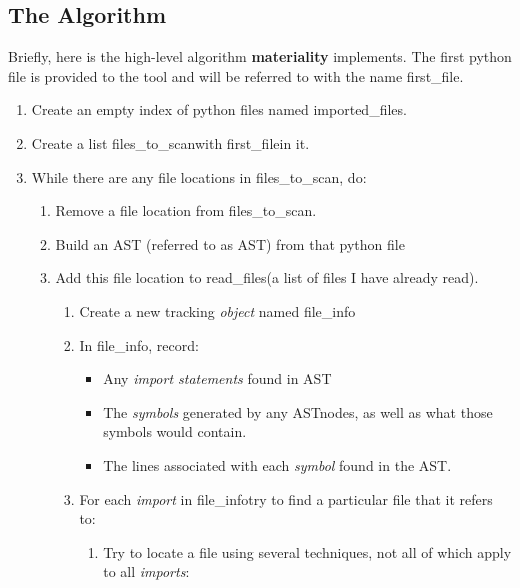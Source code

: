 \documentclass[a4paper,man,natbib,floatsintext]{apa6}
\begin{document}
  \subsection{The Algorithm}
  \singlespace %
  Briefly, here is the high-level algorithm \textbf{materiality} implements. The first \Gls{python} file is provided to the tool and will be referred to with the name \textlangle first\_file\textrangle.
  \begin{enumerate}
    \item Create an empty index of python files named \textlangle imported\_files\textrangle.
    \item Create a list \textlangle files\_to\_scan\textrangle with \textlangle first\_file\textrangle in it. 
    \item While there are any file locations in \textlangle files\_to\_scan\textrangle, do:
    \begin{enumerate}
      \item Remove a file location from \textlangle files\_to\_scan\textrangle.
      \item Build an AST (referred to as \textlangle AST\textrangle) from that \Gls{python} file
      \item Add this file location to \textlangle read\_files\textrangle (a list of files I have already read).
      \begin{enumerate}
        \item Create a new tracking \textit{object} named \textlangle file\_info\textrangle
        \item In \textlangle file\_info\textrangle, record:
        \begin{itemize}
          \item Any \textit{import statements} found in \textlangle AST\textrangle
          \item The \textit{symbols} generated by any \textlangle AST\textrangle nodes, as well as what those symbols would contain.
          \item The lines associated with each \textit{symbol} found in the \textlangle AST\textrangle.
        \end{itemize}
        \item For each \textit{import} in \textlangle file\_info\textrangle try to find a particular file that it refers to:
        \begin{enumerate}
          \item Try to locate a file using several techniques, not all of which apply to all \textit{imports}:

\end{enumerate}
\end{enumerate}
\end{enumerate}
\end{enumerate}
\end{document}
